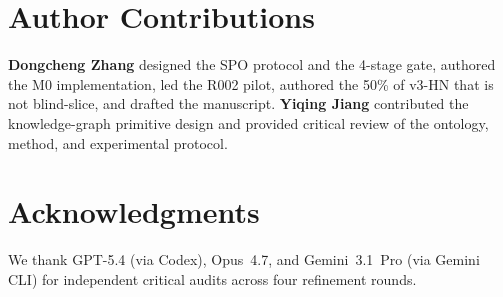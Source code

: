 \documentclass{article}
\theoremstyle{definition}
\begin{document}
\section*{Author Contributions}
\textbf{Dongcheng Zhang} designed the SPO protocol and the 4-stage
gate, authored the M0 implementation, led the R002 pilot, authored
the 50\% of v3-HN that is not blind-slice, and drafted the
manuscript. \textbf{Yiqing Jiang} contributed the knowledge-graph
primitive design and provided critical review of the ontology,
method, and experimental protocol.

\section*{Acknowledgments}
We thank GPT-5.4 (via Codex), Opus~4.7, and Gemini~3.1~Pro (via
Gemini CLI) for independent critical audits across four refinement
rounds.



\end{document}
